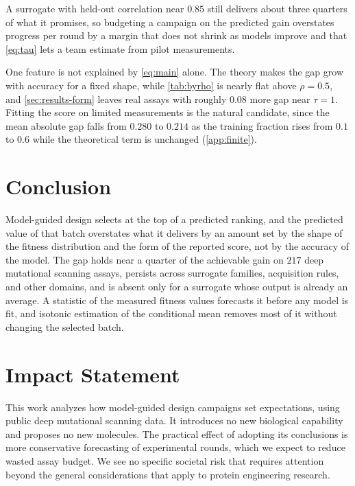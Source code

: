 \documentclass{article}
\theoremstyle{plain}
\theoremstyle{definition}
\begin{document}
A surrogate with held-out correlation near $0.85$ still delivers about three quarters
of what it promises, so budgeting a campaign on the predicted gain overstates progress
per round by a margin that does not shrink as models improve and that \cref{eq:tau}
lets a team estimate from pilot measurements.

One feature is not explained by \cref{eq:main} alone. The theory makes the gap grow
with accuracy for a fixed shape, while \cref{tab:byrho} is nearly flat above
$\rho = 0.5$, and \cref{sec:results-form} leaves real assays with roughly $0.08$ more
gap near $\tau = 1$. Fitting the score on limited measurements is the natural
candidate, since the mean absolute gap falls from $0.280$ to $0.214$ as the training
fraction rises from $0.1$ to $0.6$ while the theoretical term is unchanged
\mbox{(\cref{app:finite})}.

\section{Conclusion}
\label{sec:conclusion}

Model-guided design selects at the top of a predicted ranking, and the predicted value
of that batch overstates what it delivers by an amount set by the shape of the fitness
distribution and the form of the reported score, not by the accuracy of the model. The gap holds near a quarter of the achievable gain on $217$
deep mutational scanning assays, persists across surrogate families, acquisition rules,
and other domains, and is absent only for a surrogate whose output is already an
average. A statistic of the measured fitness values forecasts it before any
model is fit, and isotonic estimation of the conditional mean removes most of it
without changing the selected batch.

\section*{Impact Statement}

This work analyzes how model-guided design campaigns set expectations, using public
deep mutational scanning data. It introduces no new biological capability and proposes
no new molecules. The practical effect of adopting its conclusions is more conservative
forecasting of experimental rounds, which we expect to reduce wasted assay budget. We
see no specific societal risk that requires attention beyond the general considerations
that apply to protein engineering research.
\end{document}
